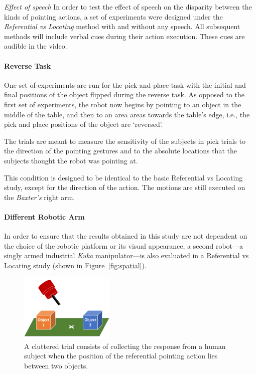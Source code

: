 \documentclass[letterpaper]{article} %
\begin{document}
\noindent\textit{Effect of speech} In order to test the effect of speech on the disparity between the kinds of pointing actions, a set of experiments were designed under the \textit{Referential vs Locating} method with and without any speech. All subsequent methods will include verbal cues during their action execution. These cues are audible in the video.

\paragraph{Reverse Task} One set of experiments are run for the pick-and-place task with the initial and final positions of the object flipped during the reverse task. As opposed to the first set of experiments, the robot now begins by pointing to an object in the middle of the table, and then to an area areas towards the table's edge, i.e., the pick and place positions of the object are `reversed'. 

The trials are meant to measure the sensitivity of the subjects in pick trials to the direction of the pointing gestures and to the absolute locations that the subjects thought the robot was pointing at.


This condition is designed to be identical to the basic Referential vs Locating study, except for the direction of the action. The motions are still executed on the \textit{Baxter's} right arm. 

\paragraph{Different Robotic Arm}
In order to ensure that the results obtained in this study are not dependent on the choice of the robotic platform or its visual appearance, a second robot---a singly armed industrial \textit{Kuka} manipulator---is also evaluated in a Referential vs Locating study (shown in Figure~\ref{fig:spatial}).


\begin{figure}[t]
    \centering
    \includegraphics[width=0.40\textwidth]{clutter_trial.png}
    \caption{A cluttered trial consists of collecting the response from a human subject when the position of the referential pointing action lies between two objects.}
    \label{fig:cluttered_trial}
\end{figure}
\end{document}
